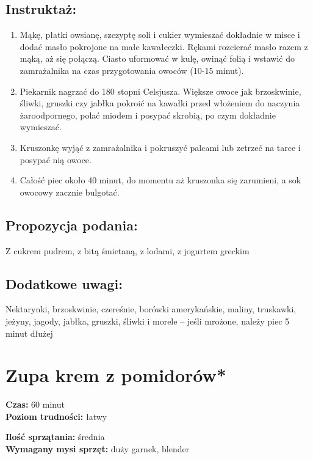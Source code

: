 \documentclass[a4paper,10pt]{book}
\begin{document}
\section*{Instruktaż:}
\begin{enumerate}
    \item Mąkę, płatki owsianę, szczyptę soli i cukier wymieszać dokładnie w misce i dodać masło pokrojone na małe kawałeczki. Rękami rozcierać masło razem z mąką, aż się połączą. Ciasto uformować w kulę, owinąć folią i wstawić do zamrażalnika na czas przygotowania owoców (10-15 minut).
    \item Piekarnik nagrzać do 180 stopni Celsjusza. Większe owoce jak brzoskwinie, śliwki, gruszki czy jabłka pokroić na kawałki przed włożeniem do naczynia żaroodpornego, polać miodem i posypać skrobią, po czym dokładnie wymieszać. 
    \item Kruszonkę wyjąć z zamrażalnika i pokruszyć palcami lub zetrzeć na tarce i posypać nią owoce.
    \item Całość piec około 40 minut, do momentu aż kruszonka się zarumieni, a sok owocowy zacznie bulgotać. 
\end{enumerate}

\vspace{0.5cm} 

\small
\section*{Propozycja podania:}
Z cukrem pudrem, z bitą śmietaną, z lodami, z jogurtem greckim

\vspace{0.3cm}

\section*{Dodatkowe uwagi:}
Nektarynki, brzoskwinie, czereśnie, borówki amerykańskie, maliny, truskawki, jeżyny, jagody, jabłka, gruszki, śliwki i morele – jeśli mrożone, należy piec 5 minut dłużej

\chapter{Zupa krem z pomidorów*}

\vspace{0.1cm}
\small
\begin{minipage}{0.45\textwidth}
    \noindent \textbf{Czas:} 60 minut \\
    \textbf{Poziom trudności:} łatwy
\end{minipage}
\begin{minipage}{0.45\textwidth}
    \noindent \textbf{Ilość sprzątania:} średnia\\
    \textbf{Wymagany mysi sprzęt:} duży garnek, blender
\end{minipage}
\normalsize
\vspace{0.5cm}
\end{document}
